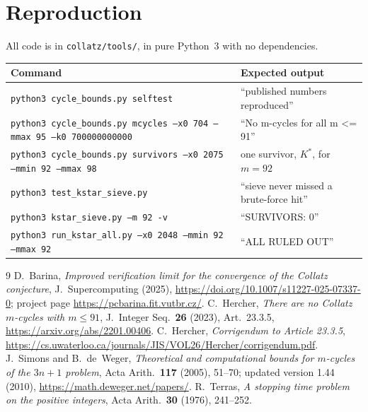 \documentclass[11pt]{amsart}
\theoremstyle{definition}
\theoremstyle{remark}
\newcommand{\Kst}{K^{*}}
\begin{document}
\section{Reproduction}\label{sec:repro}

All code is in \texttt{collatz/tools/}, in pure Python~3 with no dependencies.
\begin{center}
\scriptsize
\begin{tabular}{@{}ll@{}}
\toprule
Command & Expected output \\
\midrule
\texttt{python3 cycle\_bounds.py selftest} & ``published numbers reproduced'' \\
\texttt{python3 cycle\_bounds.py mcycles --x0 704 --mmax 95 --k0 700000000000} & ``No m-cycles for all m <= 91'' \\
\texttt{python3 cycle\_bounds.py survivors --x0 2075 --mmin 92 --mmax 98} & one survivor, $\Kst$, for $m = 92$ \\
\texttt{python3 test\_kstar\_sieve.py} & ``sieve never missed a brute-force hit'' \\
\texttt{python3 kstar\_sieve.py --m 92 -v} & ``SURVIVORS: 0'' \\
\texttt{python3 run\_kstar\_all.py --x0 2048 --mmin 92 --mmax 92} & ``ALL RULED OUT'' \\
\bottomrule
\end{tabular}
\end{center}

{\raggedright
\begin{thebibliography}{9}
 D.~Barina, \emph{Improved verification limit for the convergence of the Collatz
conjecture}, J.\ Supercomputing (2025), \url{https://doi.org/10.1007/s11227-025-07337-0}; project page
\url{https://pcbarina.fit.vutbr.cz/}.
 C.~Hercher, \emph{There are no Collatz $m$-cycles with $m \le 91$}, J.\ Integer Seq.\
\textbf{26} (2023), Art.\ 23.3.5, \url{https://arxiv.org/abs/2201.00406}.
\bibitem{hercher-corr} C.~Hercher, \emph{Corrigendum to Article 23.3.5},
\url{https://cs.uwaterloo.ca/journals/JIS/VOL26/Hercher/corrigendum.pdf}.
\bibitem{sdw} J.~Simons and B.~de~Weger, \emph{Theoretical and computational bounds for $m$-cycles of the
$3n+1$ problem}, Acta Arith.\ \textbf{117} (2005), 51--70; updated version 1.44 (2010),
\url{https://math.deweger.net/papers/}.
 R.~Terras, \emph{A stopping time problem on the positive integers}, Acta Arith.\
\textbf{30} (1976), 241--252.
\end{thebibliography}
}
\end{document}
